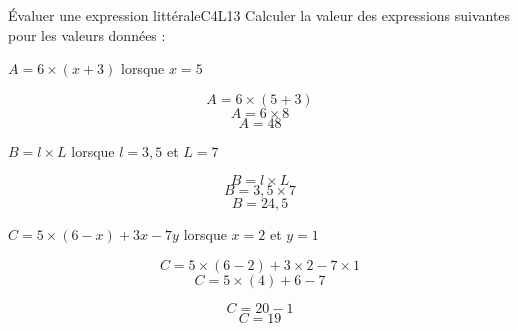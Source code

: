 \def\points{8}
\begin{EXO}{\'Evaluer une expression littérale}{C4L13}
    Calculer la valeur des expressions suivantes pour les valeurs données :
    \begin{enumerate}
        \begin{minipage}{0.4\textwidth}\item $A=6\times (x+3)$ lorsque $x=5$
            \vspace{-0.25cm}\begin{crep}
                \[A = 6\times (5+3)\]
                \[A = 6\times 8\]
                \[A = 48\]
            \end{crep}
        \end{minipage}
        \hfill
        \begin{minipage}{0.475\textwidth}\item $B=l\times L$ lorsque $l=3{,}5$ et $L=7$
            \vspace{-0.25cm}\begin{crep}
                \[B = l\times L\]
                \[B = 3{,}5\times 7\]
                \[B = 24{,}5\]
            \end{crep}
        \end{minipage}
        \begin{minipage}{0.4\textwidth}\item $C=5\times(6-x) + 3x -7y$ lorsque $x=2$ et $y=1$
            \vspace{-0.25cm}\begin{crep}
                \[C = 5\times(6-2) + 3\times 2 -7\times 1 \]
                \[C = 5\times(4) + 6 -7 \]
            \end{crep}
        \end{minipage}
        \hfill
        \begin{minipage}{0.475\textwidth}
            \begin{crep}
                \[C = 20 - 1\]
                \[C = 19\]
            \end{crep}
        \end{minipage}
    \end{enumerate}
    
\end{EXO}

